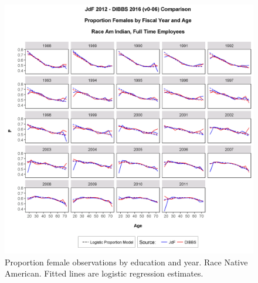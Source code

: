 \documentclass[10pt, letterpaper]{article}
\begin{document}
\begin{spacing}{1.0}
\vspace{20pt}

\begin{figure}[h]
    \centering
    \includegraphics[width=6.5in, trim={0 0 0 1in}, clip]{GenderProportionLogisticModelFYRaceAgeAv0-06.png}
    \caption{Proportion female observations by education and year.  Race Native American.  Fitted lines are logistic regression estimates.}
    \label{figure:GenderProportionLogisticModelFYRaceAgeA}
\end{figure}

\clearpage


\end{spacing}
\end{document}
